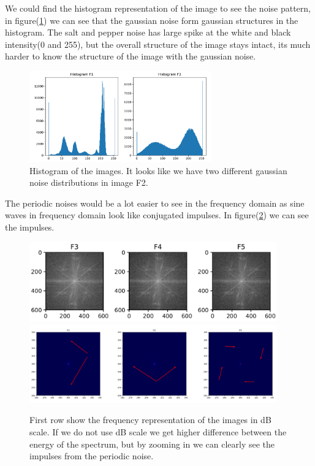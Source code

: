 {We could find the histogram representation of the image to see the noise pattern, in figure(\ref{histogramnoise}) we can see that the gaussian noise form gaussian structures in the histogram. The salt and pepper noise has large spike at the white and black intensity(0 and 255), but the overall structure of the image stays intact, its much harder to know the structure of the image with the gaussian noise.
\begin{figure}[!htb]
    {\centering
        \includegraphics[width=0.70\textwidth]{noisehist.pdf}
        \caption{Histogram of the images. It looks like we have two different gaussian noise distributions in image F2.}
        \label{histogramnoise}
    \par}
    \end{figure}

The periodic noises would be a lot easier to see in the frequency domain as sine waves in frequency domain look like conjugated impulses. In figure(\ref{fourierrep}) we can see the impulses.

    \begin{figure}[!htb]
        {\centering
            \includegraphics[width=0.95\textwidth]{fourierrep.png}
            \includegraphics[width=0.95\textwidth]{filterrep2.png}
            \caption{First row show the frequency representation of the images in dB scale. If we do not use dB scale we get higher difference between the energy of the spectrum, but by zooming in we can clearly see the impulses from the periodic noise.}
            \label{fourierrep}
        \par}
        \end{figure}


}
